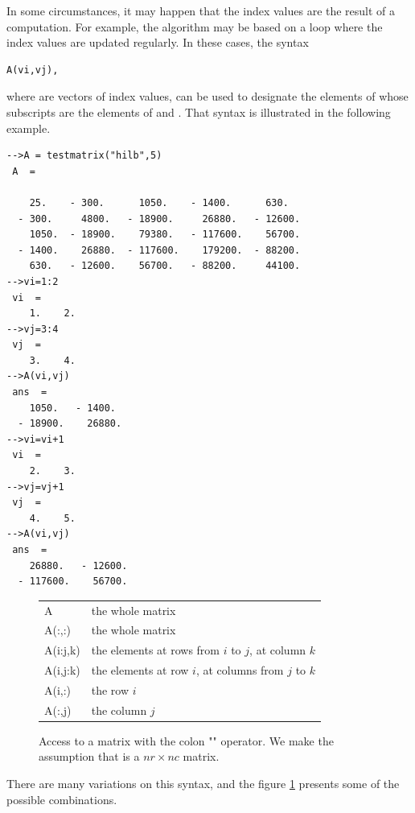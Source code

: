 In some circumstances, it may happen that the index values  
are the result of a computation. For example, the 
algorithm may be based on a loop where the index values are 
updated regularly. In these cases, the syntax 
\lstset{language=scilabscript}
\begin{lstlisting}
A(vi,vj),
\end{lstlisting}
where  are vectors of index values, can be used to designate  
the elements of  whose subscripts are the elements of  and 
.
That syntax is illustrated in the following example.
\lstset{language=scilabscript}
\begin{lstlisting}
-->A = testmatrix("hilb",5)
 A  =
 
    25.    - 300.      1050.    - 1400.      630.    
  - 300.     4800.   - 18900.     26880.   - 12600.  
    1050.  - 18900.    79380.   - 117600.    56700.  
  - 1400.    26880.  - 117600.    179200.  - 88200.  
    630.   - 12600.    56700.   - 88200.     44100.  
-->vi=1:2
 vi  =
    1.    2.  
-->vj=3:4
 vj  =
    3.    4.  
-->A(vi,vj)
 ans  =
    1050.   - 1400.   
  - 18900.    26880.  
-->vi=vi+1
 vi  =
    2.    3.  
-->vj=vj+1
 vj  =
    4.    5.  
-->A(vi,vj)
 ans  =
    26880.   - 12600.  
  - 117600.    56700.  
\end{lstlisting}

\begin{figure}
\begin{center}
\begin{tabular}{|ll|}
\hline
A & the whole matrix\\
A(:,:) & the whole matrix\\
A(i:j,k) & the elements at rows from $i$ to $j$, at column $k$\\
A(i,j:k) & the elements at row $i$, at columns from $j$ to $k$\\
A(i,:) & the row $i$\\
A(:,j) & the column $j$\\
\hline
\end{tabular}
\end{center}
\caption{Access to a matrix with the colon "\scivar{:}" operator. 
We make the assumption that  is a $nr\times nc$ matrix.}
\label{fig-introscilab-accessmatrix}
\end{figure}

There are many variations on this syntax, and the figure  
\ref{fig-introscilab-accessmatrix} presents some of the 
possible combinations.

